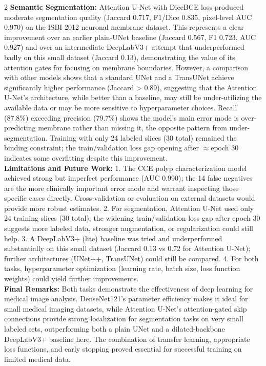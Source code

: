 ﻿\documentclass[a4paper,10pt]{article}
\begin{document}
\begin{multicols*}{2}
\textbf{Semantic Segmentation:} Attention U-Net with DiceBCE loss produced moderate segmentation quality (Jaccard 0.717, F1/Dice 0.835, pixel-level AUC 0.970) on the ISBI 2012 neuronal membrane dataset. This represents a clear improvement over an earlier plain-UNet baseline (Jaccard 0.567, F1 0.723, AUC 0.927) and over an intermediate DeepLabV3+ attempt that underperformed badly on this small dataset (Jaccard 0.13), demonstrating the value of its attention gates for focusing on membrane boundaries. However, a comparison with other models shows that a standard UNet and a TransUNet achieve significantly higher performance (Jaccard > 0.89), suggesting that the Attention U-Net's architecture, while better than a baseline, may still be under-utilizing the available data or may be more sensitive to hyperparameter choices. Recall (87.8\%) exceeding precision (79.7\%) shows the model's main error mode is over-predicting membrane rather than missing it, the opposite pattern from under-segmentation. Training with only 24 labeled slices (30 total) remained the binding constraint; the train/validation loss gap opening after $\approx$epoch 30 indicates some overfitting despite this improvement.\\

\textbf{Limitations and Future Work:}
1. The CCE polyp characterization model achieved strong but imperfect performance (AUC 0.990); the 14 false negatives are the more clinically important error mode and warrant inspecting those specific cases directly. Cross-validation or evaluation on external datasets would provide more robust estimates.
2. For segmentation, Attention U-Net used only 24 training slices (30 total); the widening train/validation loss gap after epoch 30 suggests more labeled data, stronger augmentation, or regularization could still help.
3. A DeepLabV3+ (lite) baseline was tried and underperformed substantially on this small dataset (Jaccard 0.13 vs 0.72 for Attention U-Net); further architectures (UNet++, TransUNet) could still be compared.
4. For both tasks, hyperparameter optimization (learning rate, batch size, loss function weights) could yield further improvements.\\

\textbf{Final Remarks:} Both tasks demonstrate the effectiveness of deep learning for medical image analysis. DenseNet121's parameter efficiency makes it ideal for small medical imaging datasets, while Attention U-Net's attention-gated skip connections provide strong localization for segmentation tasks on very small labeled sets, outperforming both a plain UNet and a dilated-backbone DeepLabV3+ baseline here. The combination of transfer learning, appropriate loss functions, and early stopping proved essential for successful training on limited medical data.

\end{multicols*}
\end{document}

